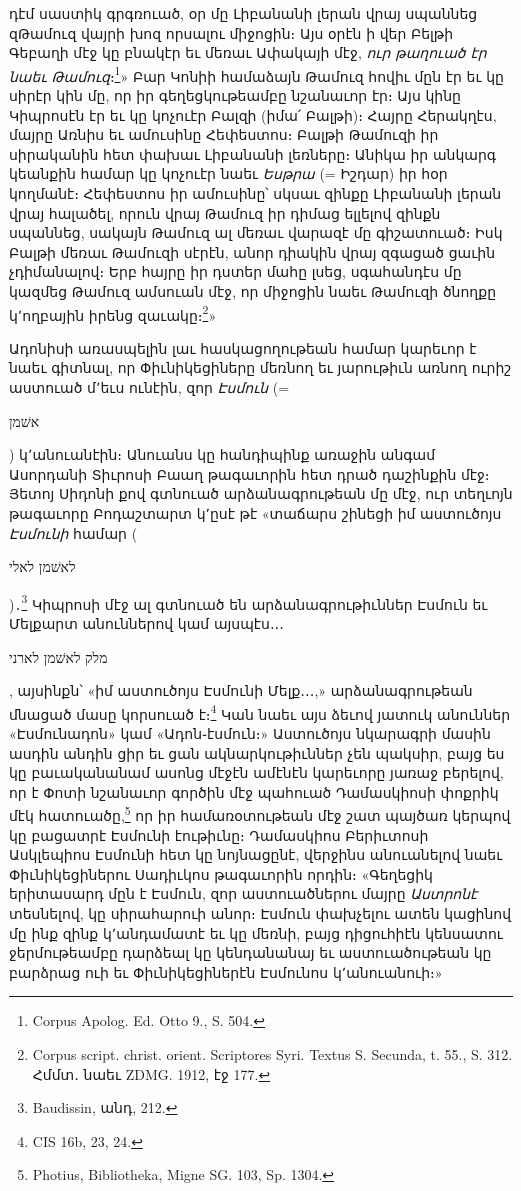 \documentclass{article}
\begin{document}
{դէմ սաստիկ գրգռուած, օր մը Լիբանանի լերան վրայ սպաննեց զԹամուզ վայրի խոզ որսալու միջոցին։ Այս օրէն ի վեր Բելթի Գեբաղի մէջ կը բնակէր եւ մեռաւ Ափակայի մէջ, \emph{ուր թաղուած էր նաեւ Թամուզ}։\footnote{Corpus Apolog. Ed. Otto 9., S. 504.}» Բար Կոնիի համաձայն Թամուզ հովիւ մըն էր եւ կը սիրէր կին մը, որ իր գեղեցկութեամբը նշանաւոր էր։ Այս կինը Կիպրոսէն էր եւ կը կոչուէր Բալզի (իմա՛ Բալթի)։ Հայրը Հերակղէս, մայրը Առնիս եւ ամուսինը Հեփեստոս։ Բալթի Թամուզի իր սիրականին հետ փախաւ Լիբանանի լեռները։ Անիկա իր անկարգ կեանքին համար կը կոչուէր նաեւ \emph{Եսթրա} (= Իշդար) իր հօր կողմանէ։ Հեփեստոս իր ամուսինը՝ սկսաւ զինքը Լիբանանի լերան վրայ հալածել, որուն վրայ Թամուզ իր դիմաց ելլելով զինքն սպաննեց, սակայն Թամուզ ալ մեռաւ վարազէ մը գիշատուած։ Իսկ Բալթի մեռաւ Թամուզի սէրէն, անոր դիակին վրայ զգացած ցաւին չդիմանալով։ Երբ հայրը իր դստեր մահը լսեց, սգահանդէս մը կազմեց Թամուզ ամսուան մէջ, որ միջոցին նաեւ Թամուզի ծնողքը կ՚ողբային իրենց զաւակը։\footnote{Corpus script. christ. orient. Scriptores Syri. Textus S. Secunda, t. 55., S. 312. Հմմտ․ նաեւ ZDMG. 1912, էջ 177.}»

Ադոնիսի առասպելին լաւ հասկացողութեան համար կարեւոր է նաեւ գիտնալ, որ Փիւնիկեցիները մեռնող եւ յարութիւն առնող ուրիշ աստուած մ՚եւս ունէին, զոր \emph{Էսմուն} (= \begin{hebrewfont}אשׁמן\end{hebrewfont}) կ՚անուանէին։ Անուանս կը հանդիպինք առաջին անգամ Ասորդանի Տիւրոսի Բաաղ թագաւորին հետ դրած դաշինքին մէջ։ Յետոյ Սիդոնի քով գտնուած արձանագրութեան մը մէջ, ուր տեղւոյն թագաւորը Բոդաշտարտ կ՚ըսէ թէ «տաճարս շինեցի իմ աստուծոյս \emph{Էսմունի} համար (\begin{hebrewfont}לאשׁמן לאלי\end{hebrewfont})․\footnote{Baudissin, անդ, 212.} Կիպրոսի մէջ ալ գտնուած են արձանագրութիւններ Էսմուն եւ Մելքարտ անուններով կամ այսպէս․․․ \begin{hebrewfont}מלק לאשׁמן לארני\end{hebrewfont}, այսինքն՝ «իմ աստուծոյս Էսմունի Մելք․․․,» արձանագրութեան մնացած մասը կորսուած է։\footnote{CIS 16b, 23, 24.} Կան նաեւ այս ձեւով յատուկ անուններ «Էսմունադոն» կամ «Ադոն֊էսմուն։» Աստուծոյս նկարագրի մասին ասդին անդին ցիր եւ ցան ակնարկութիւններ չեն պակսիր, բայց ես կը բաւականանամ ասոնց մէջէն ամէնէն կարեւորը յառաջ բերելով, որ է Փոտի նշանաւոր գործին մէջ պահուած Դամասկիոսի փոքրիկ մէկ հատուածը,\footnote{Photius, Bibliotheka, Migne SG. 103, Sp. 1304.} որ իր համառօտութեան մէջ շատ պայծառ կերպով կը բացատրէ Էսմունի էութիւնը։ Դամասկիոս Բերիւտոսի Ասկլեպիոս Էսմունի հետ կը նոյնացընէ, վերջինս անուանելով նաեւ Փիւնիկեցիներու Սադիւկոս թագաւորին որդին։ «Գեղեցիկ երիտասարդ մըն է Էսմուն, զոր աստուածներու մայրը \emph{Աստրոնէ} տեսնելով, կը սիրահարուի անոր։ Էսմուն փախչելու ատեն կացինով մը ինք զինք կ՚անդամատէ եւ կը մեռնի, բայց դիցուհիէն կենսատու ջերմութեամբը դարձեալ կը կենդանանայ եւ աստուածութեան կը բարձրաց ուի եւ Փիւնիկեցիներէն Էսմունոս կ՚անուանուի։»

}
\end{document}
